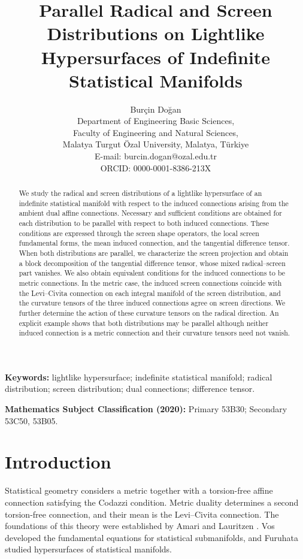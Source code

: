 \documentclass[11pt,a4paper]{article}
\title{\textbf{Parallel Radical and Screen Distributions on Lightlike
Hypersurfaces of Indefinite Statistical Manifolds}}
\author{
Bur\c{c}in Do\u{g}an\\
\small Department of Engineering Basic Sciences,\\
\small Faculty of Engineering and Natural Sciences,\\
\small Malatya Turgut \"Ozal University, Malatya, T\"urkiye\\
\small E-mail: burcin.dogan@ozal.edu.tr\\
\small ORCID: 0000-0001-8386-213X
}
\date{}
\theoremstyle{remark}
\theoremstyle{definition}
\begin{document}
\maketitle

\begin{abstract}
We study the radical and screen distributions of a lightlike hypersurface of
an indefinite statistical manifold with respect to the induced connections
arising from the ambient dual affine connections. Necessary and sufficient
conditions are obtained for each distribution to be parallel with respect to
both induced connections. These conditions are expressed through the screen
shape operators, the local screen fundamental forms, the mean induced
connection, and the tangential difference tensor. When both distributions
are parallel, we characterize the screen projection and obtain a block
decomposition of the tangential difference tensor, whose mixed
radical--screen part vanishes. We also obtain equivalent conditions for the
induced connections to be metric connections. In the metric case, the induced
screen connections coincide with the Levi--Civita connection on each integral
manifold of the screen distribution, and the curvature tensors of the three
induced connections agree on screen directions. We further determine the
action of these curvature tensors on the radical direction. An explicit
example shows that both distributions may be parallel although neither
induced connection is a metric connection and their curvature tensors need
not vanish.
\end{abstract}

\noindent
\textbf{Keywords:}
lightlike hypersurface; indefinite statistical manifold; radical distribution;
screen distribution; dual connections; difference tensor.

\medskip

\noindent
\textbf{Mathematics Subject Classification (2020):}
Primary 53B30; Secondary 53C50, 53B05.

\section{Introduction}\label{sec:introduction}

Statistical geometry considers a metric together with a torsion-free affine
connection satisfying the Codazzi condition. Metric duality determines a
second torsion-free connection, and their mean is the Levi--Civita connection.
The foundations of this theory were established by Amari \cite{Amari1985} and
Lauritzen \cite{Lauritzen1987}. Vos \cite{Vos1989} developed the fundamental
equations for statistical submanifolds, and Furuhata \cite{Furuhata2009}
studied hypersurfaces of statistical manifolds.
\end{document}
